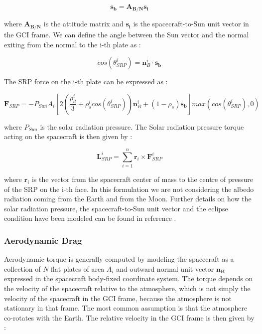 \documentclass[11pt,a4paper]{report}
\begin{document}
\begin{equation}
 \mathbf{s_b} = \mathbf{A_{B/N}} \mathbf{s_i}
\end{equation}

where $\mathbf{A_{B/N}}$ is the attitude matrix and $\mathbf{s_i}$ is the spacecraft-to-Sun unit vector in the GCI frame.
We can define the angle between the Sun vector and the normal exiting from the normal to the i-th plate as : 

\begin{equation}
 cos(\theta_{SRP}^{i}) = \mathbf{n}_{B}^{i} \cdot \mathbf{s_b}
\end{equation}

The SRP force on the i-th plate can be expressed as : 

\begin{equation}
 \mathbf{F}_{SRP} = - P_{Sun}A_{i}\left[ 2\left( \frac{\rho_{d}^{i}}{3} + \rho_{s}^{i}cos(\theta_{SRP}^{i}) \right) \mathbf{n}_{B}^{i} + (1 -\rho_{s}) \mathbf{s_b} \right] max(cos(\theta_{SRP}^{i}),0)
\end{equation}

where $P_{Sun}$ is the solar radiation pressure.
The Solar radiation pressure torque acting on the spacecraft is then given by :

\begin{equation}
    \mathbf{L}_{SRP}^{i} = \sum\limits_{i=1}^n  \mathbf{r}_{i} \times \mathbf{F}_{SRP}^{i} 
\end{equation}

where $\mathbf{r}_{i}$ is the vector from the spacecraft center of mass to the centre of pressure of the SRP on the i-th face.
In this formulation we are not considering the albedo radiation coming from the Earth and from the Moon.
Further details on how the solar radiation pressure, the spacecraft-to-Sun unit vector and the eclipse condition have been modeled can be found in reference \cite{Ref:Books:Fundamentals}.

\subsubsection{Aerodynamic Drag}
Aerodynamic torque is generally computed by modeling the spacecraft as a collection of $N$ flat plates of area $A_i$ and outward normal unit vector $\mathbf{n_{B}}$ expressed in the spacecraft body-fixed coordinate system. The torque depends on the velocity of the spacecraft relative to the atmosphere, which is not simply the velocity of the spacecraft in the GCI frame, because the atmosphere is not stationary in that frame.
The most common assumption is that the atmosphere co-rotates with the Earth. The relative velocity in the GCI frame is then given by : 
\end{document}
